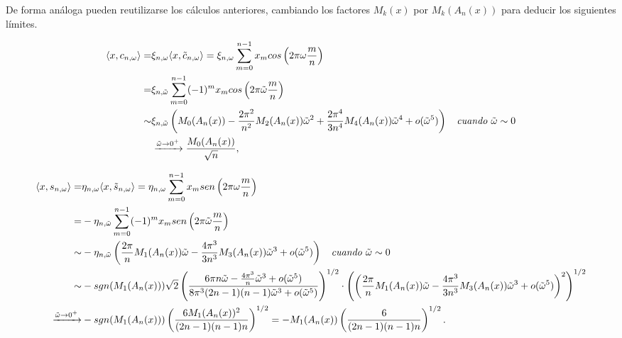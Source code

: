 De forma análoga pueden reutilizarse los cálculos anteriores,
cambiando los factores $M_{k}(x)$ por $M_{k}(A_{n}(x))$
para deducir los siguientes límites.


\begin{align*}
\langle x,
c_{n, \omega}
\rangle = & 
\xi_{n, \omega} \langle x,
\tilde{c}_{n, \omega}
\rangle =  
\xi_{n, \omega} \sum\limits_{m=0}^{n-1}x_{m} cos \left(
2 \pi \omega \frac{m}{n}
\right)
\\
= &  
\xi_{n, \tilde{\omega}} \sum\limits_{m=0}^{n-1}(-1)^{m}x_{m} cos \left(
2 \pi \tilde{\omega} \frac{m}{n}
\right)\\
\sim &
\xi_{n, \tilde{\omega}} 
\left(
M_{0}(A_{n}(x)) - \frac{2 \pi^{2}}{n^{2}}M_{2}(A_{n}(x)) \tilde{\omega}^{2} 
+ \frac{2 \pi^{4}}{3n^{4}} M_{4}(A_{n}(x)) \tilde{\omega}^{4} + o(\tilde{\omega}^{5})
\right) 
\hspace{0.2cm} \textit{ cuando } \tilde{\omega} \sim 0
\\
& 
\xrightarrow{\tilde{\omega} \rightarrow 0^{+}}
\frac{M_{0}(A_{n}(x))}{\sqrt{n}},
\end{align*}

\begin{align*}
\langle x,
s_{n, \omega}
\rangle = &
\eta_{n, \omega}
\langle
x, \tilde{s}_{n, \omega}
\rangle
= \eta_{n, \omega}
\sum\limits_{m=0}^{n-1}
x_{m}sen\left(
2 \pi \omega\frac{m}{n}
\right)
 \\
= &
- \eta_{n, \tilde{\omega}}
\sum\limits_{m=0}^{n-1}
(-1)^{m}
x_{m}sen\left(
2 \pi \tilde{\omega} \frac{m}{n}
\right)
 \\
\sim &
-\eta_{n, \tilde{\omega}}
\left(
\frac{2\pi}{n} M_{1}(A_{n}(x)) \tilde{\omega}
-\frac{4\pi^{3}}{3n^{3}} M_{3}(A_{n}(x)) \tilde{\omega}^{3}
+ o(\tilde{\omega}^{5})
\right)
\hspace{0.2cm} \textit{ cuando } \tilde{\omega} \sim 0 \\
\sim &
- sgn(M_{1}(A_{n}(x)))
\sqrt{2} 
\left(
\frac{
6 \pi n \tilde{\omega} -
\frac{4 \pi^{3}}{n} \tilde{\omega}^{3} + o(\tilde{\omega}^{5})
}{8 \pi^{3} (2n-1)(n-1)\tilde{\omega}^{3} + o(\tilde{\omega}^{5})
}
\right)^{1/2}
\cdot 
\left(
\left(
\frac{2 \pi}{n} M_{1}(A_{n}(x)) \tilde{\omega} - \frac{4 \pi^{3}}{3n^{3}}
M_{3}(A_{n}(x)) \tilde{\omega}^{3} 
+ o(\tilde{\omega}^{5})
\right)^{2}
\right)^{1/2}\\
\xrightarrow{\tilde{\omega} \rightarrow 0^{+}} & - 
sgn(M_{1}(A_{n}(x)))
\left(
\frac{6 M_{1}(A_{n}(x))^{2}}{(2n-1)(n-1)n}
\right)^{1/2}
= -M_{1}(A_{n}(x))
\left(
\frac{6}{(2n-1)(n-1)n}
\right)^{1/2}.
\end{align*}

